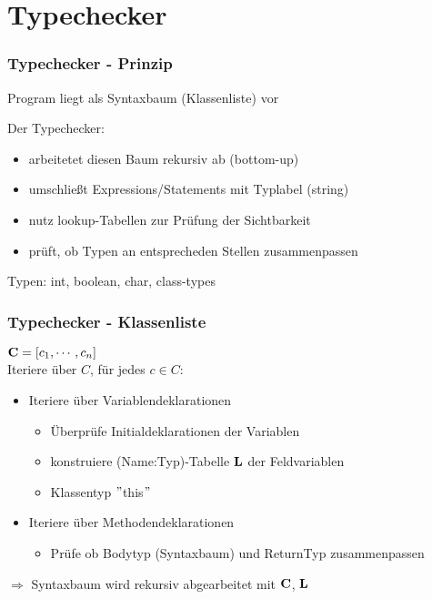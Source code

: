 \section{Typechecker}
\begin{frame}
    \frametitle{Typechecker - Prinzip}

Program liegt als Syntaxbaum (Klassenliste) vor

Der Typechecker:
\begin{itemize}
	\item arbeitetet diesen Baum rekursiv ab (bottom-up)
	\pause
	\item umschließt Expressions/Statements mit Typlabel (string)
	\pause
	\item nutz lookup-Tabellen zur Prüfung der Sichtbarkeit
	\pause
	\item prüft, ob Typen an entsprecheden Stellen zusammenpassen
\end{itemize}
\pause
Typen: int, boolean, char, class-types
\end{frame}

\begin{frame}
    \frametitle{Typechecker - Klassenliste}
${\bf C} = [c_1, \cdots , c_n]$ \\
Iteriere über $C$, für jedes $c \in C$:
\pause
\begin{itemize}
    \item Iteriere über Variablendeklarationen
    \begin{itemize}
        \item Überprüfe Initialdeklarationen der Variablen 
        \item konstruiere (Name:Typ)-Tabelle ${\bf L}$ der Feldvariablen
        \item Klassentyp $"$this$"$
    \end{itemize}
    \pause
    \item Iteriere über Methodendeklarationen
    \begin{itemize}
        \item Prüfe ob Bodytyp (Syntaxbaum) und ReturnTyp zusammenpassen
    \end{itemize}
\end{itemize}
\pause
$\Rightarrow$ Syntaxbaum wird rekursiv abgearbeitet mit ${\bf C}$, ${\bf L}$
\end{frame}

